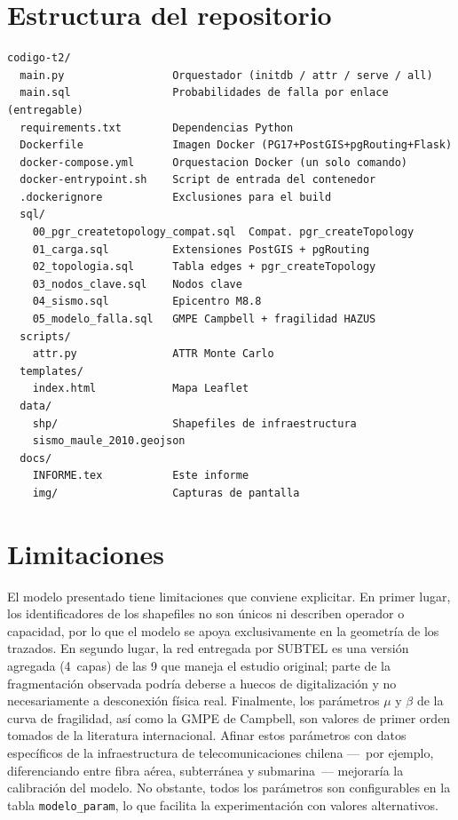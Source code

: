 \documentclass[12pt,a4paper]{article}
\begin{document}
\section{Estructura del repositorio}

\begin{lstlisting}[caption={Árbol de archivos del proyecto},language={}]
codigo-t2/
  main.py                 Orquestador (initdb / attr / serve / all)
  main.sql                Probabilidades de falla por enlace (entregable)
  requirements.txt        Dependencias Python
  Dockerfile              Imagen Docker (PG17+PostGIS+pgRouting+Flask)
  docker-compose.yml      Orquestacion Docker (un solo comando)
  docker-entrypoint.sh    Script de entrada del contenedor
  .dockerignore           Exclusiones para el build
  sql/
    00_pgr_createtopology_compat.sql  Compat. pgr_createTopology
    01_carga.sql          Extensiones PostGIS + pgRouting
    02_topologia.sql      Tabla edges + pgr_createTopology
    03_nodos_clave.sql    Nodos clave
    04_sismo.sql          Epicentro M8.8
    05_modelo_falla.sql   GMPE Campbell + fragilidad HAZUS
  scripts/
    attr.py               ATTR Monte Carlo
  templates/
    index.html            Mapa Leaflet
  data/
    shp/                  Shapefiles de infraestructura
    sismo_maule_2010.geojson
  docs/
    INFORME.tex           Este informe
    img/                  Capturas de pantalla
\end{lstlisting}


\section{Limitaciones}

El modelo presentado tiene limitaciones que conviene explicitar.  En
primer lugar, los identificadores de los shapefiles no son únicos ni
describen operador o capacidad, por lo que el modelo se apoya
exclusivamente en la geometría de los trazados.  En segundo lugar, la red
entregada por SUBTEL es una versión agregada (4~capas) de las 9 que
maneja el estudio original; parte de la fragmentación observada podría
deberse a huecos de digitalización y no necesariamente a desconexión
física real.  Finalmente, los parámetros $\mu$ y $\beta$ de la curva de
fragilidad, así como la GMPE de Campbell, son valores de primer orden
tomados de la literatura internacional.  Afinar estos parámetros con datos
específicos de la infraestructura de telecomunicaciones chilena ---~por
ejemplo, diferenciando entre fibra aérea, subterránea y submarina~---
mejoraría la calibración del modelo.  No obstante, todos los parámetros
son configurables en la tabla \texttt{modelo\_param}, lo que facilita la
experimentación con valores alternativos.
\end{document}
